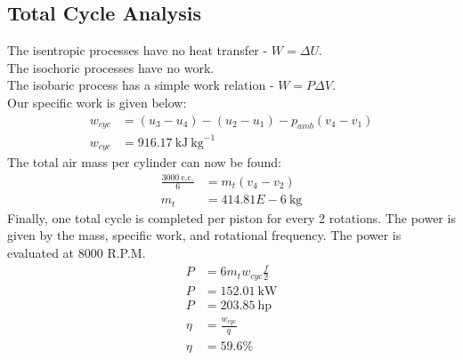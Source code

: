 \documentclass[10pt,a4paper]{article}
\begin{document}
	\subsection*{Total Cycle Analysis}
	The isentropic processes have no heat transfer - $W = \Delta U$.\\
	The isochoric processes have no work.\\
	The isobaric process has a simple work relation - $W = P \Delta V$.\\
	Our specific work is given below:
	\begin{align}
		w_{cyc} &= (u_3-u_4) - (u_2-u_1) - p_{amb}(v_4 - v_1) \\
		w_{cyc} &= 916.17\ \text{kJ}\ \text{kg}^{-1}
	\end{align}
	The total air mass per cylinder can now be found:
	\begin{align}
		\frac{3000\ \text{c.c.}}{6} &= m_t(v_4-v_2)\\
		m_t &= 414.81E-6\ \text{kg}
	\end{align}
	Finally, one total cycle is completed per piston for every 2 rotations. The power is given by the mass, specific work, and rotational frequency. The power is evaluated at 8000 R.P.M.
	\begin{align}
		P &= 6 m_t w_{cyc} \frac{f}{2}\\
		P &= 152.01\ \text{kW}\\
		P &= 203.85\ \text{hp}\\
		\eta &= \frac{w_{cyc}}{q}\\
		\eta &= 59.6 \%
	\end{align}
\end{document}
